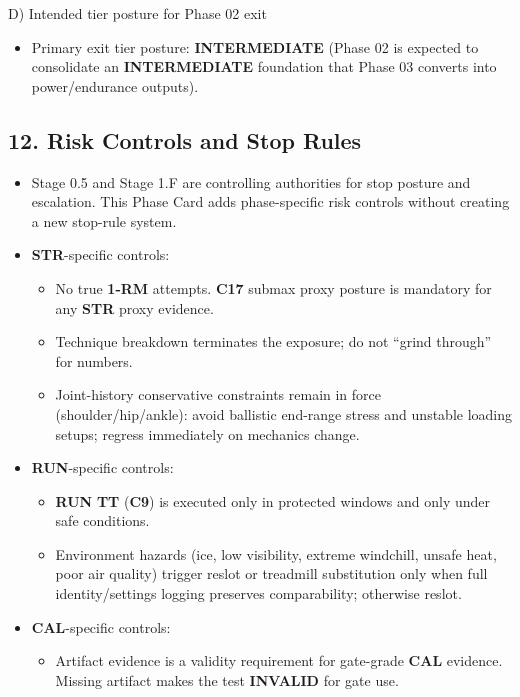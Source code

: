 \documentclass[10pt]{article}
\begin{document}
D) Intended tier posture for Phase 02 exit

\begin{itemize}
\item Primary exit tier posture: \textbf{INTERMEDIATE} (Phase 02 is expected to consolidate an \textbf{INTERMEDIATE} foundation that Phase 03 converts into power/endurance outputs).
\end{itemize}

\subsection*{12. Risk Controls and Stop Rules}

\begin{itemize}
\item Stage 0.5 and Stage 1.F are controlling authorities for stop posture and escalation. This Phase Card adds phase-specific risk controls without creating a new stop-rule system.
\item \textbf{STR}-specific controls:
\begin{itemize}
\item No true \textbf{1-RM} attempts. \textbf{C17} submax proxy posture is mandatory for any \textbf{STR} proxy evidence.
\item Technique breakdown terminates the exposure; do not “grind through” for numbers.
\item Joint-history conservative constraints remain in force (shoulder/hip/ankle): avoid ballistic end-range stress and unstable loading setups; regress immediately on mechanics change.
\end{itemize}
\item \textbf{RUN}-specific controls:
\begin{itemize}
\item \textbf{RUN} \textbf{TT} (\textbf{C9}) is executed only in protected windows and only under safe conditions.
\item Environment hazards (ice, low visibility, extreme windchill, unsafe heat, poor air quality) trigger reslot or treadmill substitution only when full identity/settings logging preserves comparability; otherwise reslot.
\end{itemize}
\item \textbf{CAL}-specific controls:
\begin{itemize}
\item Artifact evidence is a validity requirement for gate-grade \textbf{CAL} evidence. Missing artifact makes the test \textbf{INVALID} for gate use.

\end{itemize}
\end{itemize}
\end{document}

